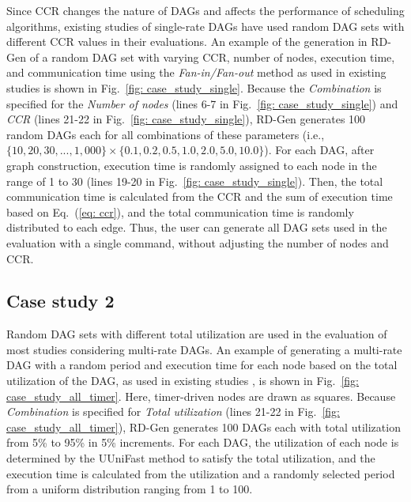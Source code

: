 Since CCR changes the nature of DAGs and affects the performance of scheduling algorithms, existing studies of single-rate DAGs have used random DAG sets with different CCR values in their evaluations.
An example of the generation in RD-Gen of a random DAG set with varying CCR, number of nodes, execution time, and communication time using the {\it Fan-in/Fan-out} method as used in existing studies \cite{subbaraj2020multi, liu2016minimizing, sheikh2016sixteen} is shown in Fig.~\ref{fig: case_study_single}.
Because the {\it Combination} is specified for the {\it Number of nodes} (lines 6-7 in Fig.~\ref{fig: case_study_single}) and {\it CCR} (lines 21-22 in Fig.~\ref{fig: case_study_single}), RD-Gen generates 100 random DAGs each for all combinations of these parameters (i.e., $\{10, 20, 30, ..., 1,000\} \times \{0.1, 0.2, 0.5, 1.0, 2.0, 5.0, 10.0\}$).
For each DAG, after graph construction, execution time is randomly assigned to each node in the range of 1 to 30 (lines 19-20 in Fig.~\ref{fig: case_study_single}).
Then, the total communication time is calculated from the CCR and the sum of execution time based on Eq.~(\ref{eq: ccr}), and the total communication time is randomly distributed to each edge.
Thus, the user can generate all DAG sets used in the evaluation with a single command, without adjusting the number of nodes and CCR.


\subsection{Case study 2}
\label{ssec: case_study_2}


Random DAG sets with different total utilization are used in the evaluation of most studies considering multi-rate DAGs.
An example of generating a multi-rate DAG with a random period and execution time for each node based on the total utilization of the DAG, as used in existing studies \cite{he2021response, gunzel2021suspension, ueter2021hard}, is shown in Fig.~\ref{fig: case_study_all_timer}.
Here, timer-driven nodes are drawn as squares.
Because {\it Combination} is specified for {\it Total utilization} (lines 21-22 in Fig.~\ref{fig: case_study_all_timer}), RD-Gen generates 100 DAGs each with total utilization from 5\% to 95\% in 5\% increments.
For each DAG, the utilization of each node is determined by the UUniFast method to satisfy the total utilization, and the execution time is calculated from the utilization and a randomly selected period from a uniform distribution ranging from 1 to 100.


